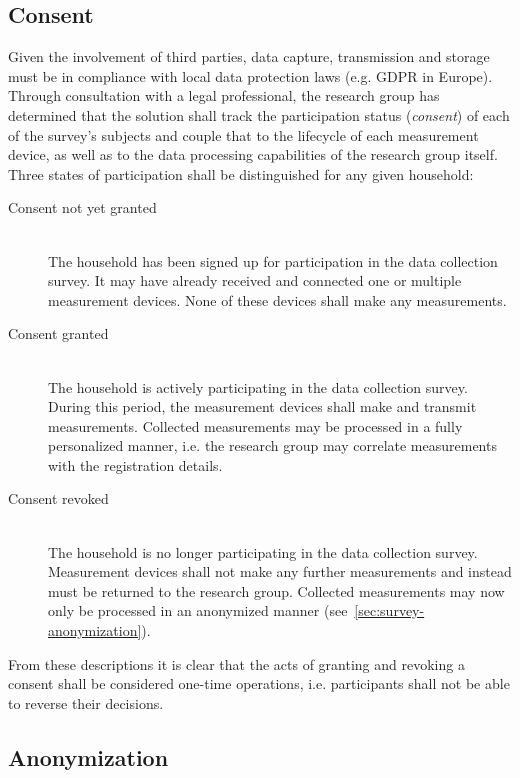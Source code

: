 \subsection{Consent}
\label{sec:survey-consent}

Given the involvement of third parties, data capture, transmission and storage must be in compliance with local data protection laws (e.g. \acs{GDPR} in Europe). Through consultation with a legal professional, the research group has determined that the solution shall track the participation status (\textit{consent}) of each of the survey's subjects and couple that to the lifecycle of each measurement device, as well as to the data processing capabilities of the research group itself. Three states of participation shall be distinguished for any given household:

\begin{description}
  \item[Consent not yet granted]
  \hfill \\
  The household has been signed up for participation in the data collection survey. It may have already received and connected one or multiple measurement devices. None of these devices shall make any measurements.

  \item[Consent granted]
  \hfill \\
  The household is actively participating in the data collection survey. During this period, the measurement devices shall make and transmit measurements. Collected measurements may be processed in a fully personalized manner, i.e. the research group may correlate measurements with the registration details.

  \item[Consent revoked]
  \hfill \\
  The household is no longer participating in the data collection survey. Measurement devices shall not make any further measurements and instead must be returned to the research group. Collected measurements may now only be processed in an anonymized manner (see~\autoref{sec:survey-anonymization}).
\end{description}

From these descriptions it is clear that the acts of granting and revoking a consent shall be considered one-time operations, i.e. participants shall not be able to reverse their decisions.


\subsection{Anonymization}
\label{sec:survey-anonymization}

